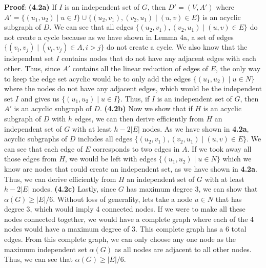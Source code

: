 \documentclass[oneside]{projectpaper} %
\begin{document}
\textbf{Proof}:
\newline
\textbf{(4.2a)} If $I$ is an independent set of $G$, then $D' = (V, A')$ where $A' = \{(u_1, u_2) \mid u \in I\} \cup \{(u_2, v_1), (v_2, u_1) \mid (u, v) \in E\}$ is an acyclic subgraph of $D$. We can see that all edges $\{(u_2, v_1), (v_2, u_1) \mid (u, v) \in E\}$ do not create a cycle because as we have shown in Lemma 4a, a set of edges $\{(v_i, v_j) \mid (v_i, v_j) \in A, i > j\}$ do not create a cycle. We also know that the independent set $I$ contains nodes that do not have any adjacent edges with each other. Thus, since $A'$ contains all the linear reduction of edges of $E$, the only way to keep the edge set acyclic would be to only add the edges $\{(u_1, u_2) \mid u \in N\}$ where the nodes do not have any adjacent edges, which would be the independent set $I$ and gives us $\{(u_1, u_2) \mid u \in I\}$. Thus, if $I$ is an independent set of $G$, then $A'$ is an acyclic subgraph of $D$.
\newline
\newline
\textbf{(4.2b)} Now we show that if $H$ is an acyclic subgraph of $D$ with $h$ edges, we can then derive efficiently from $H$ an independent set of $G$ with at least $h-2|E|$ nodes. As we have shown in \textbf{4.2a}, acyclic subgraphs of $D$ includes all edges $\{(u_2, v_1), (v_2, u_1) \mid (u, v) \in E\}$.  We can see that each edge of $E$ corresponds to two edges in $A$. If we took away all those edges from $H$, we would be left with edges $\{(u_1, u_2) \mid u \in N\}$ which we know are nodes that could create an independent set, as we have shown in \textbf{4.2a}. Thus, we can derive efficiently from $H$ an independent set of $G$ with at least $h-2|E|$ nodes.
\newline
\newline
\textbf{(4.2c)} Lastly, since $G$ has maximum degree 3, we can show that $\alpha(G) \geq |E|/6$. Without loss of generality, lets take a node $u \in N$ that has degree 3, which would imply 4 connected nodes. If we were to make all these nodes connected together, we would have a complete graph where each of the 4 nodes would have a maximum degree of 3. This complete graph has a 6 total edges. From this complete graph, we can only choose any one node as the maximum independent set $\alpha(G)$ as all nodes are adjacent to all other nodes. Thus, we can see that $\alpha(G) \geq |E|/6$.
\newline
\newline
\end{document}
